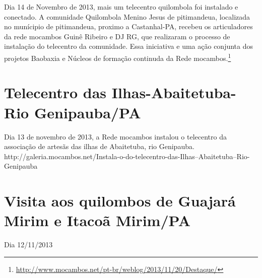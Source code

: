 \documentclass[a4paper, 11pt, oneside]{Relatorio_sem}  %
\begin{document}
Dia 14 de Novembro de 2013, mais um telecentro quilombola foi
instalado e conectado.  A comunidade Quilombola Menino Jesus de
pitimandeua, localizada no munícipio de pitimandeua, proximo a
Castanhal-PA, recebeu os articuladores da rede mocambos Guinê Ribeiro
e DJ RG, que realizaram o processo de instalação do telecentro da
comunidade.  Essa iniciativa e uma ação conjunta dos projetos Baobaxia
e Núcleos de formação continuda da Rede
mocambos.\footnote{\url{http://www.mocambos.net/pt-br/weblog/2013/11/20/Destaque/}}


\section{Telecentro das Ilhas-Abaitetuba-Rio Genipauba/PA}

Dia 13 de novembro de 2013, a Rede mocambos instalou o telecentro da
associação de artesãs das ilhas de Abaitetuba, rio Genipauba.
http://galeria.mocambos.net/Instala-o-do-telecentro-das-Ilhas--Abaitetuba--Rio-Genipauba


\section{Visita aos quilombos de Guajará Mirim e Itacoã Mirim/PA}
Dia 12/11/2013 
\end{document}
